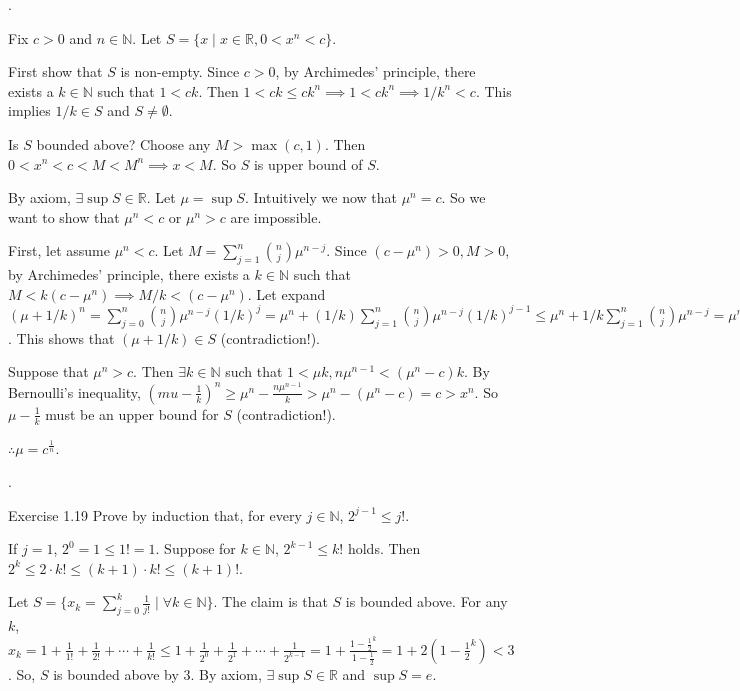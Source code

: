 \documentclass[8pt]{beamer}
\newcommand{\mbb}[1]{\mathbb{#1}}
\begin{document}
\begin{frame}{.}
    \begin{example}
        Fix $c>0$ and $n \in \mbb{N}$.
        Let $S = \{x \mid x \in \mbb{R}, 0 <x^n <c \}$.

        First show that $S$ is non-empty.
        Since $c >0$, by Archimedes' principle, there exists a $k \in \mbb{N}$ such that $1 < ck$.
        Then $1 < ck \leq ck^n \implies 1 < ck^n \implies 1/k^n < c$.
        This implies $1/k \in S$ and $S \neq \emptyset$.

        Is $S$ bounded above?
        Choose any $M > \max (c,1)$.
        Then $0 < x^n < c < M < M^n \implies x < M$.
        So $S$ is upper bound of $S$.

        By axiom, $\exists \sup S \in \mbb{R}$.
        Let $\mu = \sup S$.
        Intuitively we now that $\mu^n = c$.
        So we want to show that $\mu^n < c$ or $\mu^n >c$ are impossible.

        First, let assume $\mu^n < c$.
        Let $M = \sum_{j=1}^n \binom{n}{j} \mu^{n-j}$.
        Since $(c - \mu^n) >0, M >0$, by Archimedes' principle, there exists a $k \in \mbb{N}$ such that $M < k (c - \mu^n) \implies M/k < (c - \mu^n)$.
        Let expand $(\mu + 1/k)^n = \sum_{j=0}^n \binom{n}{j} \mu^{n-j} (1/k)^j = \mu^n + (1/k)\sum_{j=1}^n \binom{n}{j} \mu^{n-j} (1/k)^{j-1} \leq \mu^n + 1/k \sum_{j=1}^n \binom{n}{j} \mu^{n-j} = \mu^n + M/k \leq \mu^n + (c - \mu^n) =c$.
        This shows that $(\mu + 1/k) \in S$ (contradiction!).
        
        Suppose that $\mu^n > c$. Then $\exists k \in \mbb{N}$  such that $1 < \mu k, n \mu^{n-1} < (\mu^n -c) k$. By Bernoulli's inequality, $(mu - \frac{1}{k})^n \geq \mu^n - \frac{n \mu^{n-1}}{k} > \mu^n - (\mu^n - c) = c > x^n$.
        So $\mu - \frac{1}{k}$ must be an upper bound for $S$ (contradiction!).

        $\therefore \mu = c^{\frac{1}{n}}$.
    \end{example}
\end{frame}

\begin{frame}{.}
    \begin{block}{Exercise 1.19}
        Prove by induction that, for every $j \in \mbb{N}$, $2^{j-1} \leq j!$.

        If $j=1$, $2^0 = 1 \leq 1! = 1$.
        Suppose for $k \in \mbb{N}$, $2^{k-1} \leq k!$ holds.
        Then $2^k \leq 2 \cdot k! \leq (k+1)\cdot k! \leq (k+1)!$.
    \end{block}


    \begin{example}
        Let $S = \{x_k = \sum_{j=0}^k \frac{1}{j!} \mid \forall k \in \mbb{N}\}$.
        The claim is that $S$ is bounded above.
        For any $k$, $x_k = 1 + \frac{1}{1!} + \frac{1}{2!} + \cdots + \frac{1}{k!} \leq 1 + \frac{1}{2^0} + \frac{1}{2^1} + \cdots + \frac{1}{2^{k-1}} = 1 + \frac{1 - \frac{1}{2}^k}{1 - \frac{1}{2}} = 1 + 2\left(1 - \frac{1}{2}^k\right) <3$.
        So, $S$ is bounded above by $3$.
        By axiom, $\exists \sup S \in \mbb{R}$ and $\sup S = e$.
    \end{example}
\end{frame}
\end{document}
